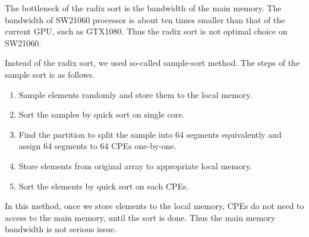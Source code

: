 \documentclass[]{pasj01}
\begin{document}
The bottleneck of the radix sort is the bandwidth of the main memory.
The bandwidth of SW21060 processor is about ten times smaller than
that of the current GPU, such as GTX1080. Thus the radix sort is not
optimal choice on SW21060.

Instead of the radix sort, we used so-called sample-sort method. The
steps of the sample sort is as follows.

\begin{enumerate}
  
\item Sample elements randomly and store them to the local memory.

\item Sort the samples by quick sort on single core.

\item Find the partition to split the sample into 64 segments
  equivalently and assign 64 segments to 64 CPEs one-by-one.

\item Store elements from original array to appropriate local memory.

\item Sort the elements by quick sort on each CPEs.
  
\end{enumerate}

In this method, once we store elements to the local memory, CPEs do
not need to access to the main memory, until the sort is done. Thus
the main memory bandwidth is not serious issue.
\end{document}
